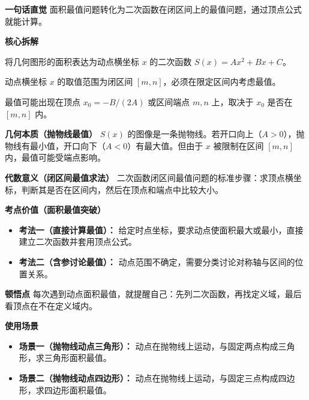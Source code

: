 \begin{explanationbox}
	\textbf{\textcolor{CExplanation}{一句话直觉}}
	面积最值问题转化为二次函数在闭区间上的最值问题，通过顶点公式就能计算。

	\medskip
	\textbf{\textcolor{CExplanation}{核心拆解}}
	\begin{description}[style=nextline, leftmargin=2.8em, labelsep=0.5em, itemsep=0.45em]
		\item[\textbf{要点一（二次函数建模）：}]
			将几何图形的面积表达为动点横坐标 $x$ 的二次函数 $S(x)=Ax^{2}+Bx+C$。
		\item[\textbf{要点二（区间限定）：}]
			动点横坐标 $x$ 的取值范围为闭区间 $[m,n]$，必须在限定区间内考虑最值。
		\item[\textbf{要点三（顶点判定）：}]
			最值可能出现在顶点 $x_{0}=-B/(2A)$ 或区间端点 $m,n$ 上，取决于 $x_{0}$ 是否在 $[m,n]$ 内。
	\end{description}

	\medskip
	\textbf{\textcolor{CExplanation}{几何本质（抛物线最值）}}
	$S(x)$ 的图像是一条抛物线。若开口向上（$A>0$），抛物线有最小值，开口向下（$A<0$）有最大值。但由于 $x$ 被限制在区间 $[m,n]$ 内，最值可能受端点影响。

	\medskip
	\textbf{\textcolor{CExplanation}{代数意义（闭区间最值求法）}}
	二次函数闭区间最值问题的标准步骤：求顶点横坐标，判断其是否在区间内，然后在顶点和端点中比较大小。

	\medskip
	\textbf{\textcolor{CExplanation}{考点价值（面积最值突破）}}
	\begin{itemize}[leftmargin=*, itemsep=0.5em, topsep=0.4em]
		\item \textbf{考法一（直接计算最值）：} 给定时点坐标，要求动点使面积最大或最小，直接建立二次函数并套用顶点公式。
		\item \textbf{考法二（含参讨论最值）：} 动点范围不确定，需要分类讨论对称轴与区间的位置关系。
	\end{itemize}

	\medskip
	\textbf{\textcolor{CExplanation}{顿悟点}}
	每次遇到动点面积最值，就提醒自己：先列二次函数，再找定义域，最后看顶点在不在定义域内。

	\medskip
	\textbf{\textcolor{CExplanation}{使用场景}}
	\begin{itemize}[leftmargin=*, itemsep=0.5em, topsep=0.4em]
		\item \textbf{场景一（抛物线动点三角形）：} 动点在抛物线上运动，与固定两点构成三角形，求三角形面积最值。
		\item \textbf{场景二（抛物线动点四边形）：} 动点在抛物线上运动，与固定三点构成四边形，求四边形面积最值。
	\end{itemize}

\end{explanationbox}
